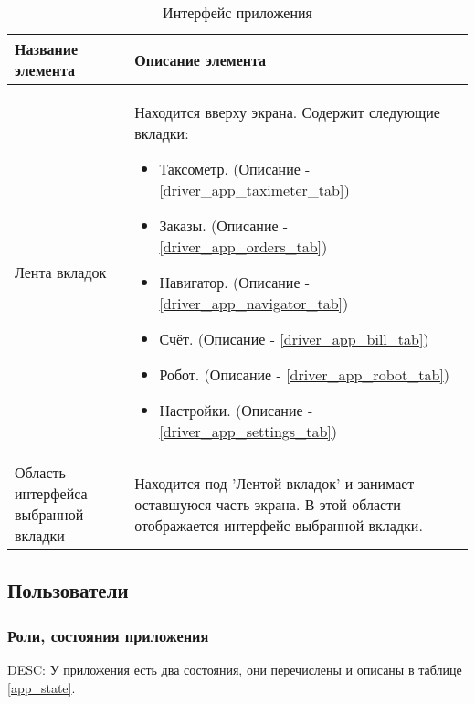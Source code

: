    \begin{table}
    \begin{center}
    \caption {Интерфейс приложения}
    \label{app_interface}
    \setlength{\extrarowheight}{2mm}
      \begin{tabular}{|p{5cm}|p{10cm}|}
        \hline     \textbf{Название элемента}&\textbf{Описание элемента} \\ [2mm]

        \hline   Лента вкладок & Находится вверху экрана. Содержит следующие вкладки: \begin{itemize} \item Таксометр. (Описание - \ref{driver_app_taximeter_tab}) \item Заказы. (Описание - \ref{driver_app_orders_tab}) \item Навигатор. (Описание - \ref{driver_app_navigator_tab}) \item Счёт. (Описание - \ref{driver_app_bill_tab}) \item Робот. (Описание - \ref{driver_app_robot_tab}) \item Настройки. (Описание - \ref{driver_app_settings_tab}) \end{itemize}\\ [2mm]

        \hline   Область интерфейса выбранной вкладки & Находится под 'Лентой вкладок' и занимает оставшуюся часть экрана. В этой области отображается интерфейс выбранной вкладки.\\ [2mm]

        \hline
      \end{tabular}
    \end{center}
    \end{table}

  \subsection{Пользователи}

      \subsubsection{Роли, состояния приложения}

      		DESC: У приложения есть два состояния, они перечислены и описаны в таблице \ref{app_state}. 

